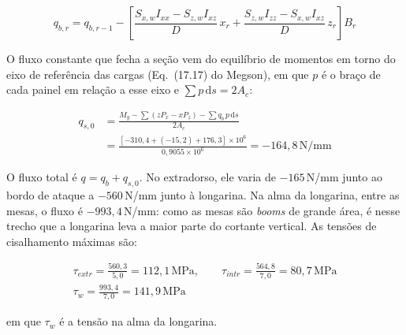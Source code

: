 \begin{equation}
    q_{b,r} = q_{b,r-1} - \left[\frac{S_{x,w} I_{xx} - S_{z,w} I_{xz}}{D}\, x_r + \frac{S_{z,w} I_{zz} - S_{x,w} I_{xz}}{D}\, z_r\right] B_r
    \label{eq:rev_qb}
\end{equation}
 
O fluxo constante que fecha a seção vem do equilíbrio de momentos em torno do eixo de referência das cargas (Eq.~(17.17) do Megson), em que $p$ é o braço de cada painel em relação a esse eixo e $\sum p\,\mathrm{d}s = 2A_c$:
 
\begin{equation}
    \begin{aligned}
        q_{s,0} &= \frac{M_y - \sum (z P_x - x P_z) - \sum q_b\, p\, \mathrm{d}s}{2A_c} \\
        &= \frac{\left[-310{,}4 + (-15{,}2) + 176{,}3\right] \times 10^{6}}{0{,}9055 \times 10^{6}} = -164{,}8\,\text{N/mm}
    \end{aligned}
    \label{eq:rev_qs0}
\end{equation}
 
O fluxo total é $q = q_b + q_{s,0}$. No extradorso, ele varia de $-165$\,N/mm junto ao bordo de ataque a $-560$\,N/mm junto à longarina. Na alma da longarina, entre as mesas, o fluxo é $-993{,}4$\,N/mm: como as mesas são \textit{booms} de grande área, é nesse trecho que a longarina leva a maior parte do cortante vertical. As tensões de cisalhamento máximas são:
 
\begin{equation}
    \begin{gathered}
        \tau_{extr} = \frac{560{,}3}{5{,}0} = 112{,}1\,\text{MPa}, \qquad
        \tau_{intr} = \frac{564{,}8}{7{,}0} = 80{,}7\,\text{MPa} \\
        \tau_{w} = \frac{993{,}4}{7{,}0} = 141{,}9\,\text{MPa}
    \end{gathered}
    \label{eq:rev_tau}
\end{equation}
 
\noindent em que $\tau_w$ é a tensão na alma da longarina.
 
